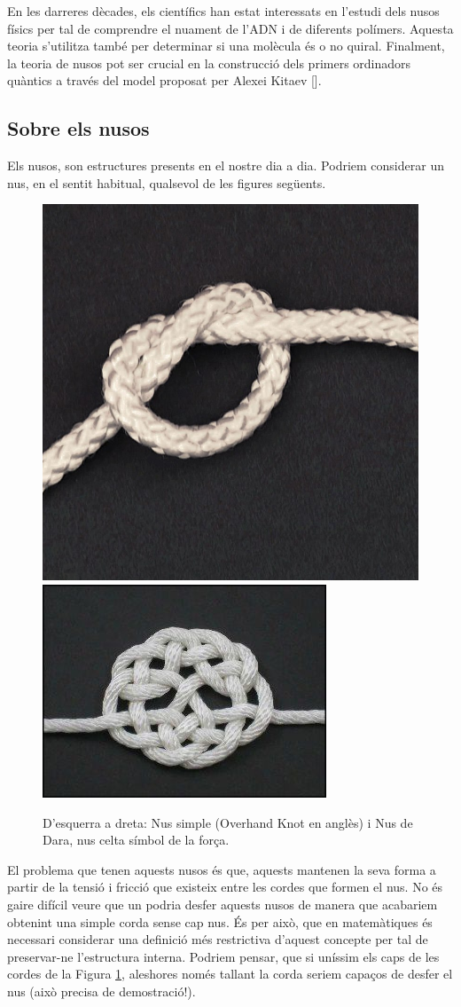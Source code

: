 En les darreres dècades, els científics han estat interessats en l'estudi dels nusos físics per tal de comprendre el nuament de l'ADN i de diferents polímers. Aquesta teoria s'utilitza també per determinar si una molècula és o no quiral. Finalment, la teoria de nusos pot ser crucial en la construcció dels primers ordinadors quàntics a través del model proposat per Alexei Kitaev [\cite{computingwithquantumknots}].\\

\subsection{Sobre els nusos}\label{subsec:sobreelsnusos}
Els nusos, son estructures presents en el nostre dia a dia. Podriem considerar un nus, en el sentit habitual, qualsevol de les figures següents.

\begin{figure}[h]
  \centering
  \includegraphics[width=0.401\linewidth]{img/nus simple.jpg}
  \includegraphics[width=0.535\linewidth]{img/Nus de Dara.jpg}
  \caption{D'esquerra a dreta: Nus simple (Overhand Knot en anglès) i Nus de Dara, nus celta símbol de la força.
  }\label{fig:exemples de nusos}
\end{figure}

El problema que tenen aquests nusos és que, aquests mantenen la seva forma a partir de la tensió i fricció que existeix entre les cordes que formen el nus. No és gaire difícil veure que un podria desfer aquests nusos de manera que acabariem obtenint una simple corda sense cap nus. És per això, que en matemàtiques és necessari considerar una definició més restrictiva d'aquest concepte per tal de preservar-ne l'estructura interna. Podriem pensar, que si uníssim els caps de les cordes de la Figura \ref{fig:exemples de nusos}, aleshores només tallant la corda seriem capaços de desfer el nus (això precisa de demostració!).